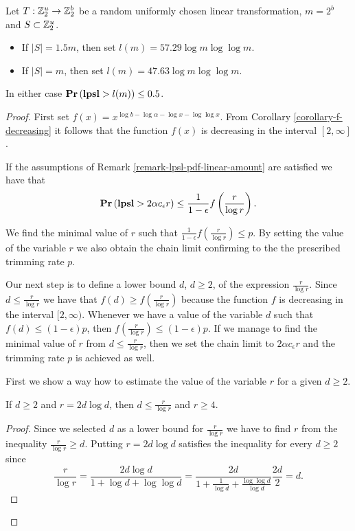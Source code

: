 \begin{theorem}
\label{theorem-model-chain-limit-rule}
Let $T: \mathbb{Z}_{2}^{u} \rightarrow \mathbb{Z}_{2}^{b}$ be a random uniformly chosen linear transformation, $m = 2 ^ b$ and $S \subset \mathbb{Z}_{2}^{u}$.
\begin{itemize}
\item If $|S| = 1.5 m$, then set $l(m) = 57.29 \log m \log \log m$.
\item If $|S| = m$, then set $l(m) = 47.63 \log m \log \log m$.
\end{itemize}
In either case $\mathbf{Pr}\left(\mathbf{lpsl} > l(m)\right) \leq 0.5$.
\end{theorem}
\begin{proof}
First set $f(x) = x ^ {\log b - \log \alpha - \log x - \log \log x}$. From Corollary \ref{corollary-f-decreasing} it follows that the function $f(x)$ is decreasing in the interval $\left[2, \infty \right]$.

If the assumptions of Remark \ref{remark-lpsl-pdf-linear-amount} are satisfied we have that 
\[
	\mathbf{Pr}\left(\mathbf{lpsl} > 2 \alpha c_\epsilon r\right) \leq \frac{1}{1 - \epsilon} f\left(\frac{r}{\log r}\right) \text{.}
\]

We find the minimal value of $r$ such that $\frac{1}{1 - \epsilon} f\left(\frac{r}{\log r}\right) \leq p$. By setting the value of the variable $r$ we also obtain the chain limit confirming to the the prescribed trimming rate $p$. 

Our next step is to define a lower bound $d$, $d \geq 2$, of the expression $\frac{r}{\log r}$. Since $d \leq \frac{r}{\log r}$ we have that $f(d) \geq f\left(\frac{r}{\log r}\right)$ because the function $f$ is decreasing in the interval $[2, \infty)$. Whenever we have a value of the variable $d$ such that $f(d) \leq (1 - \epsilon) p$, then $f\left(\frac{r}{\log r}\right) \leq (1- \epsilon) p$. If we manage to find the minimal value of $r$ from $d \leq \frac{r}{\log r}$, then we set the chain limit to $2 \alpha c_\epsilon r$ and the trimming rate $p$ is achieved as well. 

First we show a way how to estimate the value of the variable $r$ for a given $d \geq 2$. 
\begin{claim}
\label{claim-choose-r}
If $d \geq 2$ and $r = 2d \log d$, then $d \leq \frac{r}{\log r}$ and $r \geq 4$.
\end{claim}
\begin{proof}
Since we selected $d$ as a lower bound for $\frac{r}{\log r}$ we have to find $r$ from the inequality $\frac{r}{\log r} \geq d$. Putting $r = 2 d \log d$ satisfies the inequality for every $d \geq 2$ since
\[
\frac{r}{\log r} = \frac{2 d \log d}{1 + \log d + \log \log d} = \frac{2 d}{1 + \frac{1}{\log d} + \frac{\log \log d}{\log d}} \frac{2d}{2} = d \text{.}
\]


\end{proof}
\end{proof}
